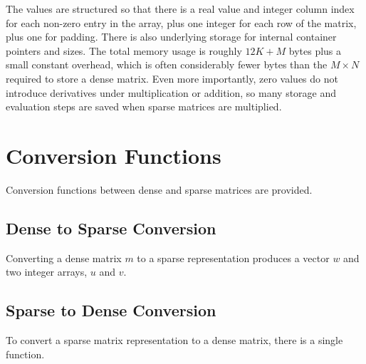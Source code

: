 The values are structured so that there is a real value and integer
column index for each non-zero entry in the array, plus one integer
for each row of the matrix, plus one for padding.  There is also
underlying storage for internal container pointers and sizes.  The
total memory usage is roughly $12 K + M$ bytes plus a small constant
overhead, which is often considerably fewer bytes than the $M \times N$
required to store a dense matrix.  Even more importantly, zero
values do not introduce derivatives under multiplication or addition,
so many storage and evaluation steps are saved when sparse matrices
are multiplied.

\section{Conversion Functions}

Conversion functions between dense and sparse matrices are provided.

\subsection{Dense to Sparse Conversion}

Converting a dense matrix $m$ to a sparse representation produces a
vector $w$ and two integer arrays, $u$ and $v$.

\begin{description}
%
%
%
%
\end{description}
%

\subsection{Sparse to Dense Conversion}

To convert a sparse matrix representation to a dense matrix, there is
a single function.
%
\begin{description}
\end{description}

